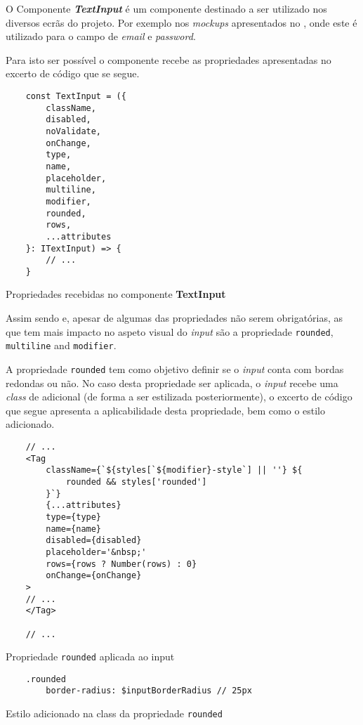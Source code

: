 
O Componente \textbf{\textit{TextInput}} é um componente destinado a ser utilizado nos diversos ecrãs do projeto. Por exemplo nos \textit{mockups} apresentados no , onde este é utilizado para o campo de \textit{email} e \textit{password}.

Para isto ser possível o componente recebe as propriedades apresentadas no excerto de código que se segue.

\begin{longlisting}
	\begin{verbatim}
	const TextInput = ({
		className,
		disabled,
		noValidate,
		onChange,
		type,
		name,
		placeholder,
		multiline,
		modifier,
		rounded,
		rows,
		...attributes
	}: ITextInput) => {
		// ...
	}
	\end{verbatim}

	\caption{Propriedades recebidas no componente \textbf{TextInput}}
\end{longlisting}

Assim sendo e, apesar de algumas das propriedades não serem obrigatórias, as que tem mais impacto no aspeto visual do \textit{input} são a propriedade \texttt{rounded}, \texttt{multiline} and \texttt{modifier}.

A propriedade \texttt{rounded} tem como objetivo definir se o \textit{input} conta com bordas redondas ou não. No caso desta propriedade ser aplicada, o \textit{input} recebe uma \textit{class} de \textbf{} adicional (de forma a ser estilizada posteriormente), o excerto de código que segue apresenta a aplicabilidade desta propriedade, bem como o estilo adicionado.

\begin{longlisting}
	\begin{verbatim}
	// ...
	<Tag
		className={`${styles[`${modifier}-style`] || ''} ${
			rounded && styles['rounded']
		}`}
		{...attributes}
		type={type}
		name={name}
		disabled={disabled}
		placeholder='&nbsp;'
		rows={rows ? Number(rows) : 0}
		onChange={onChange}
	>
	// ...
	</Tag>

	// ...
	\end{verbatim}

	\caption{Propriedade \texttt{rounded} aplicada ao input}
\end{longlisting}

\begin{longlisting}
	\begin{verbatim}
	.rounded
		border-radius: $inputBorderRadius // 25px
	\end{verbatim}

	\caption{Estilo adicionado na class da propriedade \texttt{rounded}}
\end{longlisting}

